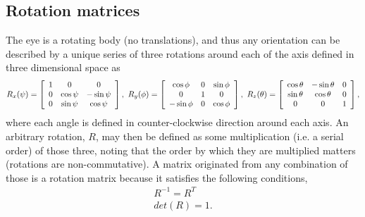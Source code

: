 \subsection{Rotation matrices}
\label{rotmatsss}
The eye is a rotating body (no translations), and thus any orientation can be described by a unique series of three rotations around each of the axis defined in three dimensional space as
\begin{equation}
\label{rrr}
R _ { x } ( \psi ) = \left[ \begin{array} { c c c } { 1 } & { 0 } & { 0 } \\ { 0 } & { \cos \psi } & { - \sin \psi } \\ { 0 } & { \sin \psi } & { \cos \psi} \end{array} \right], \
R _ { y } ( \phi ) = \left[ \begin{array} { c c c } { \cos \phi } & { 0 } & { \sin \phi } \\ { 0 } & { 1 } & { 0 } \\ { - \sin \phi } & { 0 } & { \cos \phi } \end{array} \right], \
R _ { z } ( \theta ) = \left[ \begin{array} { c c c } { \cos \theta } & { - \sin \theta } & { 0 } \\ { \sin \theta } & { \cos \theta } & { 0 } \\ { 0 } & { 0 } & { 1 } \end{array} \right],
\end{equation}
where each angle is defined in counter-clockwise direction around each axis. An arbitrary rotation, $R$, may then be defined as some multiplication (i.e. a serial order) of those three, noting that the order by which they are multiplied matters (rotations are non-commutative). A matrix originated from any combination of those is a rotation matrix because it satisfies the following conditions,
\begin{align}
	R^{-1} = R^T\\
	det(R) = 1.
\end{align} 

